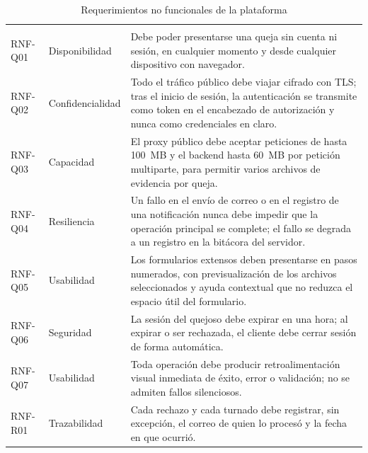 	\begin{longtable}{|p{1.7cm}|p{2.7cm}|p{9.7cm}|}
		\caption{Requerimientos no funcionales de la plataforma}
		\label{tab:rnf} \\
		\hline
		\rowcolor{headerblue}
		\headercell{ID} & \headercell{Categoría} & \headercell{Atributo requerido} \\
		\hline
		\endfirsthead
	
		\hline
		\rowcolor{headerblue}
		\headercell{ID} & \headercell{Categoría} & \headercell{Atributo requerido} \\
		\hline
		\endhead
	
		RNF-Q01 & Disponibilidad & Debe poder presentarse una queja sin cuenta ni sesión, en
		cualquier momento y desde cualquier dispositivo con navegador. \\ \hline
	
		RNF-Q02 & Confidencialidad & Todo el tráfico público debe viajar cifrado con TLS; tras el
		inicio de sesión, la autenticación se transmite como token en el encabezado de autorización y
		nunca como credenciales en claro. \\ \hline
	
		RNF-Q03 & Capacidad & El proxy público debe aceptar peticiones de hasta 100~MB y el backend
		hasta 60~MB por petición multiparte, para permitir varios archivos de evidencia por queja.
		\\ \hline
	
		RNF-Q04 & Resiliencia & Un fallo en el envío de correo o en el registro de una notificación
		nunca debe impedir que la operación principal se complete; el fallo se degrada a un registro
		en la bitácora del servidor. \\ \hline
	
		RNF-Q05 & Usabilidad & Los formularios extensos deben presentarse en pasos numerados, con
		previsualización de los archivos seleccionados y ayuda contextual que no reduzca el espacio
		útil del formulario. \\ \hline
	
		RNF-Q06 & Seguridad & La sesión del quejoso debe expirar en una hora; al expirar o ser
		rechazada, el cliente debe cerrar sesión de forma automática. \\ \hline
	
		RNF-Q07 & Usabilidad & Toda operación debe producir retroalimentación visual inmediata de
		éxito, error o validación; no se admiten fallos silenciosos. \\ \hline
	
		RNF-R01 & Trazabilidad & Cada rechazo y cada turnado debe registrar, sin excepción, el
		correo de quien lo procesó y la fecha en que ocurrió. \\ \hline
	

\end{longtable}
